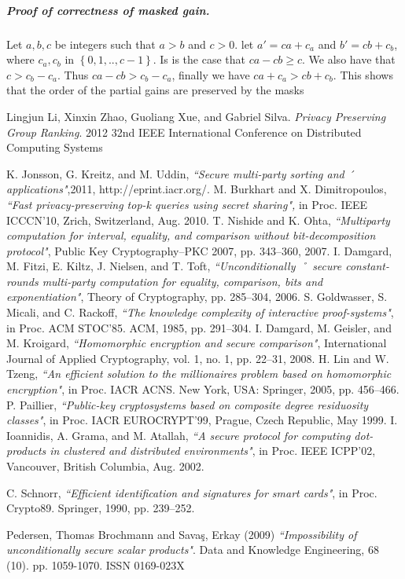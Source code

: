 \documentclass[11pt, a4paper, oneside, openright]{book} %
\begin{document}
\subparagraph{Proof of correctness of masked gain.}
Let $a,b,c$ be integers such that $a > b$ and $c > 0$. let $a'=ca+c_a$ and $b'=cb+c_b $, where $c_a,c_b$ in $ \left\lbrace 0,1,..,c-1 \right\rbrace$. Is is the case that $ca - cb \geq c$. We also have that $c > c_b - c_a$. Thus $ca -cb > c_b - c_a$, finally we have $ca+c_a > cb+c_b$. This shows that the order of the partial gains are preserved by the masks
\begin{thebibliography}{9}
Lingjun Li, Xinxin Zhao, Guoliang Xue, and Gabriel Silva. 
\textit{Privacy Preserving Group Ranking}. 
2012 32nd IEEE International Conference on Distributed Computing Systems
 
 K. Jonsson, G. Kreitz, and M. Uddin, 
\textit{``Secure multi-party sorting and ´
applications"},2011, http://eprint.iacr.org/.
 M. Burkhart and X. Dimitropoulos, \textit{``Fast privacy-preserving top-k
queries using secret sharing",} in Proc. IEEE ICCCN’10, Zrich, Switzerland,
Aug. 2010.
 T. Nishide and K. Ohta, \textit{``Multiparty computation for interval, equality,
and comparison without bit-decomposition protocol"}, Public Key
Cryptography–PKC 2007, pp. 343–360, 2007.
I. Damgard, M. Fitzi, E. Kiltz, J. Nielsen, and T. Toft, \textit{``Unconditionally ˚
secure constant-rounds multi-party computation for equality, comparison,
bits and exponentiation"}, Theory of Cryptography, pp. 285–304,
2006.
 S. Goldwasser, S. Micali, and C. Rackoff, \textit{``The knowledge complexity
of interactive proof-systems"}, in Proc. ACM STOC’85. ACM, 1985,
pp. 291–304.
I. Damgard, M. Geisler, and M. Kroigard, \textit{``Homomorphic encryption
and secure comparison"}, International Journal of Applied Cryptography,
vol. 1, no. 1, pp. 22–31, 2008.
H. Lin and W. Tzeng, \textit{``An efficient solution to the millionaires problem
based on homomorphic encryption"}, in Proc. IACR ACNS. New York,
USA: Springer, 2005, pp. 456–466.
P. Paillier, \textit{``Public-key cryptosystems based on composite degree residuosity
classes"}, in Proc. IACR EUROCRYPT’99, Prague, Czech Republic,
May 1999.
I. Ioannidis, A. Grama, and M. Atallah, \textit{``A secure protocol for computing
dot-products in clustered and distributed environments"}, in Proc.
IEEE ICPP’02, Vancouver, British Columbia, Aug. 2002.

C. Schnorr, 
\textit{``Efficient identification and signatures for smart cards"}, in
Proc. Crypto89. Springer, 1990, pp. 239–252.

Pedersen, Thomas Brochmann and Savaş, Erkay (2009) \textit{``Impossibility of unconditionally secure scalar products"}. Data and Knowledge Engineering, 68 (10). pp. 1059-1070. ISSN 0169-023X

\end{thebibliography}
\end{document}
